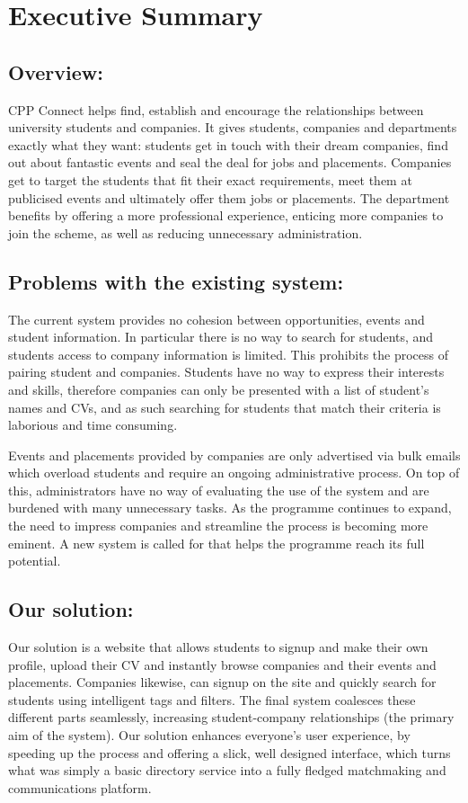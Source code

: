 \section{Executive Summary}

\subsection{Overview:}
CPP Connect helps find, establish and encourage the relationships between university students and companies. It gives students, companies and departments exactly what they want: students get in touch with their dream companies, find out about fantastic events and seal the deal for jobs and placements. Companies get to target the students that fit their exact requirements, meet them at publicised events and ultimately offer them jobs or placements. The department benefits by offering a more professional experience, enticing more companies to join the scheme, as well as reducing unnecessary administration.

\subsection{Problems with the existing system:}
The current system provides no cohesion between opportunities, events and student information. In particular there is no way to search for students, and students access to company information is limited. This prohibits the process of pairing student and companies. 
Students have no way to express their interests and skills, therefore companies can only be presented with a list of student's names and CVs, and as such searching for students that match their criteria is laborious and time consuming.

Events and placements provided by companies are only advertised via bulk emails which overload students and require an ongoing administrative process. On top of this, administrators have no way of evaluating the use of the system and are burdened with many unnecessary tasks.    
As the programme continues to expand, the need to impress companies and streamline the process is becoming more eminent. A new system is called for that helps the programme reach its full potential.

\subsection{Our solution:}
Our solution is a website that allows students to signup and make their own profile, upload their CV and instantly browse companies and their events and placements. Companies likewise, can signup on the site and quickly search for students using intelligent tags and filters. The final system coalesces these different parts seamlessly, increasing student-company relationships (the primary aim of the system). Our solution enhances everyone's user experience, by speeding up the process and offering a slick, well designed interface, which turns what was simply a basic directory service into a fully fledged matchmaking and communications platform.
